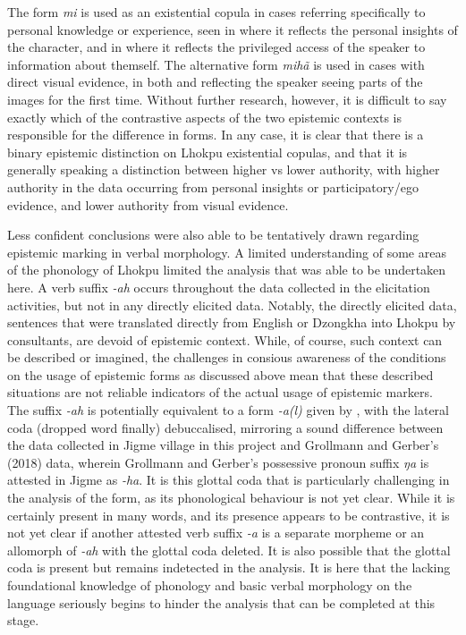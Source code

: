 The form \textit{mi} is used as an existential copula in cases referring specifically to personal knowledge or experience, seen in  where it reflects the personal insights of the character, and in  where it reflects the privileged access of the speaker to information about themself. The alternative form \textit{mihã} is used in cases with direct visual evidence, in both  and  reflecting the speaker seeing parts of the images for the first time. Without further research, however, it is difficult to say exactly which of the contrastive aspects of the two epistemic contexts is responsible for the difference in forms. In any case, it is clear that there is a binary epistemic distinction on Lhokpu existential copulas, and that it is generally speaking a distinction between higher vs lower authority, with higher authority in the data occurring from personal insights or participatory/ego evidence, and lower authority from visual evidence.

Less confident conclusions were also able to be tentatively drawn regarding epistemic marking in verbal morphology. A limited understanding of some areas of the phonology of Lhokpu limited the analysis that was able to be undertaken here. A verb suffix \textit{-ah} occurs throughout the data collected in the elicitation activities, but not in any directly elicited data. Notably, the directly elicited data, sentences that were translated directly from English or Dzongkha into Lhokpu by consultants, are devoid of epistemic context. While, of course, such context can be described or imagined, the challenges in consious awareness of the conditions on the usage of epistemic forms as discussed above mean that these described situations are not reliable indicators of the actual usage of epistemic markers. The suffix \textit{-ah} is potentially equivalent to a form \textit{-a(l)} given by \cite{Grollmann2018}, with the lateral coda (dropped word finally) debuccalised, mirroring a sound difference between the data collected in Jigme village in this project and Grollmann and Gerber's (2018) data, wherein Grollmann and Gerber's possessive pronoun suffix \textit{ŋa} is attested in Jigme as \textit{-ha}. It is this glottal coda that is particularly challenging in the analysis of the form, as its phonological behaviour is not yet clear. While it is certainly present in many words, and its presence appears to be contrastive, it is not yet clear if another attested verb suffix \textit{-a} is a separate morpheme or an allomorph of \textit{-ah} with the glottal coda deleted. It is also possible that the glottal coda is present but remains indetected in the analysis. It is here that the lacking foundational knowledge of phonology and basic verbal morphology on the language seriously begins to hinder the analysis that can be completed at this stage.

